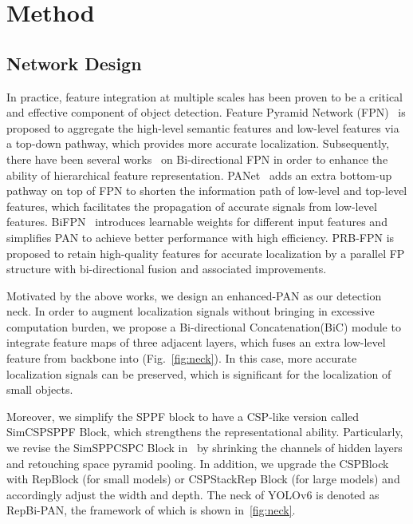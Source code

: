 \documentclass[10pt,twocolumn,letterpaper]{article}
\begin{document}
\section{Method}
\label{sec:method}

\subsection{Network Design}
  \label{sec:method:network}
  In practice, feature integration at multiple scales has been proven to be a critical and effective component of object detection. Feature Pyramid Network (FPN)~\cite{lin2017feature} is proposed to aggregate the high-level semantic features and low-level features via a top-down pathway, which provides more accurate localization. Subsequently, there have been several works~\cite{liu2018path, tan2020efficientdet, ghiasi2019fpn, chen2021parallel} on Bi-directional FPN in order to enhance the ability of hierarchical feature representation. PANet~\cite{liu2018path} adds an extra bottom-up pathway on top of FPN to shorten the information path of low-level and top-level features, which facilitates the propagation of accurate signals from low-level features. BiFPN~\cite{tan2020efficientdet} introduces learnable weights for different input features and simplifies PAN to achieve better performance with high efficiency. PRB-FPN \cite{chen2021parallel} is proposed to retain high-quality features for accurate localization by a parallel FP structure with bi-directional fusion and associated improvements.

  Motivated by the above works, we design an enhanced-PAN as our detection neck. In order to augment localization signals without bringing in excessive computation burden, we propose a Bi-directional Concatenation(BiC) module to integrate feature maps of three adjacent layers, which fuses an extra low-level feature from backbone  into  (Fig.~\ref{fig:neck}). In this case, more accurate localization signals can be preserved, which is significant for the localization of small objects. 

  Moreover, we simplify the SPPF block \cite{yolov5} to have a CSP-like version called SimCSPSPPF Block, which strengthens the representational ability. Particularly, we revise the SimSPPCSPC Block in~\cite{wang2022yolov7} by shrinking the channels of hidden layers and retouching space pyramid pooling. In addition, we upgrade the CSPBlock with RepBlock (for small models) or CSPStackRep Block (for large models) and accordingly adjust the width and depth. The neck of YOLOv6 is denoted as RepBi-PAN, the framework of which is shown in~\cref{fig:neck}.
\end{document}
